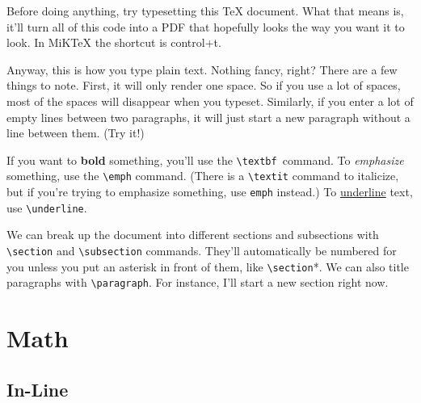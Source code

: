 \documentclass[12pt]{article}
\begin{document}
\maketitle %


Before doing anything, try typesetting this TeX document. What that means is, it'll turn all of this code into a PDF that hopefully looks the way you want it to look. In MiKTeX the shortcut is control+t. 

Anyway, this is how you type plain text. Nothing fancy, right? There are a few things to note. First, it will only render one space. So if you use     a lot of spaces, most of the spaces will disappear when you typeset. Similarly, if you enter a lot of empty lines between two paragraphs, it will just start a new paragraph without a line between them. (Try it!)

If you want to \textbf{bold} something, you'll use the \verb|\textbf |command. To \emph{emphasize} something, use the \verb|\emph| command. (There is a \verb|\textit| command to italicize, but if you're trying to emphasize something, use \verb|emph| instead.) To \underline{underline} text, use \verb|\underline|. 

We can break up the document into different sections and subsections with \verb|\section| and \verb|\subsection| commands. They'll automatically be numbered for you unless you put an asterisk in front of them, like \verb|\section|*. We can also title paragraphs with \verb|\paragraph|. For instance, I'll start a new section right now.




\section{Math}


\subsection{In-Line}
\end{document}
